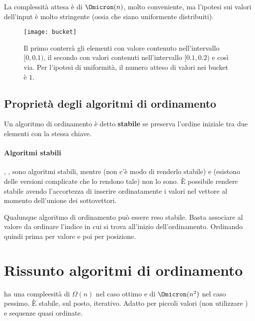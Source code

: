 La complessità attesa è di \(\Omicron(n)\), molto conveniente, ma l'ipotesi sui valori dell'input è molto stringente (ossia che siano uniformente distribuiti).

\begin{figure}[H]\centering
    \texttt{[image: bucket]}
    \caption[]{Il primo  conterrà gli elementi con valore contenuto nell'intervallo \([0, 0.1)\), il secondo con valori contenuti nell'intervallo \([0.1, 0.2)\) e così via. Per l'ipotesi di uniformità, il numero atteso di valori nei bucket è \(1\).}
\end{figure}

\clearpage
\subsection*{Proprietà degli algoritmi di ordinamento}

\begin{definition*}[stabilità]
Un algoritmo di ordinamento è detto \textbf{stabile} se preserva l'ordine iniziale tra due elementi con la stessa chiave.
\end{definition*}

\paragraph{Algoritmi stabili}
\insertionSort, \mergeSort, \pigeonholeSort sono algoritmi stabili, mentre \heapSort (non c'è modo di renderlo stabile) e \quickSort (esistono delle versioni complicate che lo rendono tale) non lo sono.
\`{E} possibile rendere stabile \mergeSort avendo l'accortezza di inserire ordinatamente i valori nel vettore al momento dell'unione dei sottovettori.

\begin{note}
Qualunque algoritmo di ordinamento può essere reso stabile.
Basta associare al valore da ordinare l'indice in cui si trova all'inizio dell'ordinamento.
Ordinando quindi prima per valore e poi per posizione.
\end{note}

\section{Rissunto algoritmi di ordinamento}

\insertionSort ha una compleesità di \(\Omega(n)\) nel caso ottimo e di \(\Omicron(n^2)\) nel caso pessimo.
\`{E} stabile, sul posto, iterativo.
Adatto per piccoli valori (non utilizzare \quickSort) e sequenze quasi ordinate.

